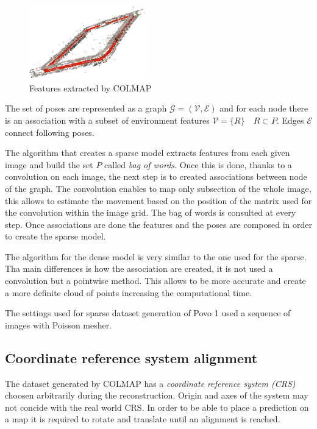 \begin{figure}[h]
    \begin{center}
        \includegraphics[width=0.45\textwidth]{./imgs/extracted_features_colmap.png}
    \end{center}
    \caption{Features extracted by COLMAP}
    \label{fig:features-colmap}
\end{figure}

The set of poses are represented as a graph $\mathcal{G}=(\mathcal{V}, \mathcal{E})$ and for each node there is an association with a subset of environment features $\mathcal{V} = \{R\}\quad R\subset P$. Edges $\mathcal{E}$ connect following poses.

The algorithm that creates a sparse model extracts features from each given image and build the set $P$ called \textit{bag of words}. Once this is done, thanks to a convolution on each image, the next step is to created associations between node of the graph. The convolution enables to map only subsection of the whole image, this allows to estimate the movement based on the position of the matrix used for the convolution within the image grid. The bag of words is consulted at every step. Once associations are done the features and the poses are composed in order to create the sparse model.

The algorithm for the dense model is very similar to the one used for the sparse. Tha main differences is how the association are created, it is not used a convolution but a pointwise method. This allows to be more accurate and create a more definite cloud of points increasing the computational time.

The settings used for sparse dataset generation of Povo 1 used a sequence of images with Poisson mesher.

\subsection{Coordinate reference system alignment}
The dataset generated by COLMAP has a \textit{coordinate reference system (CRS)} choosen arbitrarily during the reconstruction. Origin and axes of the system may not concide with the real world CRS. In order to be able to place a prediction on a map it is required to rotate and translate until an alignment is reached.

